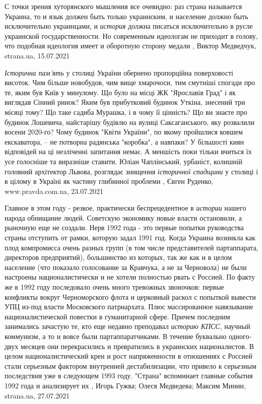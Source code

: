 С точки зрения хуторянского мышления все очевидно: раз страна называется
Украина, то и язык должен быть только украинским, и население должно быть
исключительно украинцами, и \emph{история} должна писаться исключительно в русле
украинской государственности. Но современным идеологам не приходит в голову,
что подобная идеология имеет и оборотную сторону медали
, 
Виктор Медведчук, strana.ua, 15.07.2021


\emph{Історична пам'ять} у столиці України обернено пропорційна поверховості
висоток.  Чим більше новобудов, чим вище хмарочоси, тим смутніші спогади про
те, яким був Київ у минулому.  Що було на місці ЖК "Ярославів Град" і як
виглядав Сінний ринок? Яким був прибутковий будинок Уткіна, знесений три місяці
тому? Що таке садиба Мурашка, і в чому її цінність?  Що ви знаєте про будинок
Лошевича, найстарішу будівлю на вулиці Саксаганського, яку розвалили восени
2020-го? Чому будинок "Квіти України", по якому пройшлися ковшем екскаватора, –
не потворна радянська "коробка", а навпаки?  У більшості киян відповідей на ці
незліченні запитання немає. А меншість поки тільки вчиться їх усе голосніше та
виразніше ставити.  Юліан Чаплінський, урбаніст, колишній головний архітектор
Львова, розглядає знищення \emph{історичної спадщини} у столиці і в цілому в
Україні як частину глибинної проблеми
, 
Євген Руденко, www.pravda.com.ua, 23.07.2021

Главное в этом году - резкое, практически беспрецедентное в \emph{истории}
нашего народа обнищание людей. Советскую экономику новые власти остановили, а
рыночную еще не создали.  Нерв 1992 года - это первые попытки руководства
страны отступить от рамки, которую задал 1991 год. Когда Украина возникла как
плод компромисса очень разных групп (в том числе представителей партаппарата,
директоров предприятий), большинство из которых, так же как и в целом население
(что показало голосование за Кравчука, а не за Черновола) не были настроены
националистически и не хотели полностью рвать с Россией.  По факту же в 1992
году последовало очень много тревожных звоночков: первые конфликты вокруг
Черноморского флота и церковный раскол с попыткой вывести УПЦ из-под власти
Московского патриархата. Плюс массированное навязывание националистической
повестки в гуманитарной сфере.  Причем последним занимались зачастую те, кто
еще недавно преподавал \emph{историю КПСС}, научный коммунизм, а то и вовсе
были партаппаратчиками. В течение буквально одного-двух месяцев они
перекрасились и превратились в украинских националистов.  В целом
националистический крен и рост напряженности в отношениях с Россией стали
серьезным фактором внутренней дестабилизации, что привело к серьезным
последствия уже в следующем 1993 году.  "Страна" вспоминает главные события
1992 года и анализирует их
, 
Игорь Гужва; Олеся Медведева; Максим Минин, strana.ua, 27.07.2021

